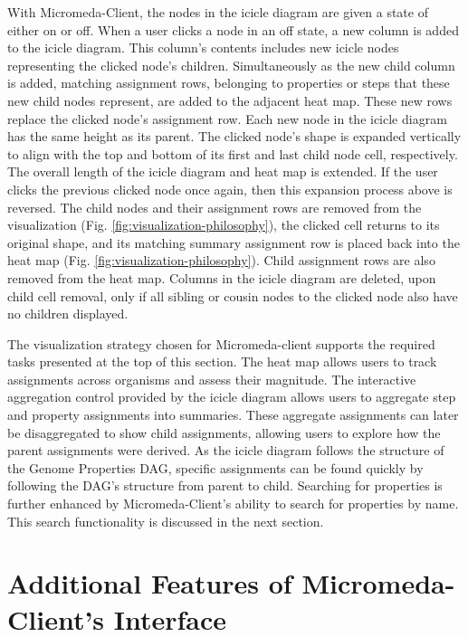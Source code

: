 With Micromeda-Client, the nodes in the icicle diagram are given a state of either on or off. When a user clicks a node in an off state, a new column is added to the icicle diagram. This column's contents includes new icicle nodes representing the clicked node's children. Simultaneously as the new child column is added, matching assignment rows, belonging to properties or steps that these new child nodes represent, are added to the adjacent heat map. These new rows replace the clicked node's assignment row. Each new node in the icicle diagram has the same height as its parent. The clicked node's shape is expanded vertically to align with the top and bottom of its first and last child node cell, respectively. The overall length of the icicle diagram and heat map is extended. If the user clicks the previous clicked node once again, then this expansion process above is reversed. The child nodes and their assignment rows are removed from the visualization (Fig. \ref{fig:visualization-philosophy}), the clicked cell returns to its original shape, and its matching summary assignment row is placed back into the heat map (Fig. \ref{fig:visualization-philosophy}). Child assignment rows are also removed from the heat map. Columns in the icicle diagram are deleted, upon child cell removal, only if all sibling or cousin nodes to the clicked node also have no children displayed.

The visualization strategy chosen for Micromeda-client supports the required tasks presented at the top of this section. The heat map allows users to track assignments across organisms and assess their magnitude. The interactive aggregation control provided by the icicle diagram allows users to aggregate step and property assignments into summaries. These aggregate assignments can later be disaggregated to show child assignments, allowing users to explore how the parent assignments were derived. As the icicle diagram follows the structure of the Genome Properties DAG, specific assignments can be found quickly by following the DAG's structure from parent to child. Searching for properties is further enhanced by Micromeda-Client's ability to search for properties by name. This search functionality is discussed in the next section.

\section{Additional Features of Micromeda-Client's Interface} \label{client-additional-features}

